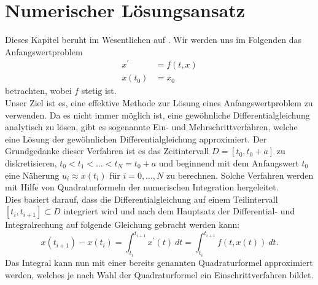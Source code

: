 \section{Numerischer Lösungsansatz}
\label{sec:numeric}
Dieses Kapitel beruht im Wesentlichen auf \cite{p.deuflhardf.bornemannNumerischeMathematikGewohnliche,
ernsthairergerhardwannerSolvingOrdinaryDifferential, prof.dr.josefstoerNumerischeMathematik}. Wir werden uns im
Folgenden das Anfangswertproblem
\begin{align}
    \label{first-order-num}
    x^{\prime} &= f(t,x) \nonumber \\
    x(t_0) &= x_0
\end{align}
betrachten, wobei $f$ stetig ist.\\
Unser Ziel ist es, eine effektive Methode zur Lösung eines Anfangswertproblem zu verwenden.
Da es nicht immer möglich ist, eine gewöhnliche Differentialgleichung analytisch zu lösen, gibt es sogenannte Ein- und
Mehrschrittverfahren, welche  eine Lösung der gewöhnlichen Differentialgleichung approximiert.
Der Grundgedanke dieser Verfahren ist es das Zeitintervall \linebreak $D=[t_0,t_{0}+a]$ zu diskretisieren,
$t_0 < t_1 < \dots < t_N = t_{0}+a$ und beginnend mit dem Anfangswert $t_0$ eine Näherung $u_i \approx x(t_i)$ für
$i=0, \dots, N$ zu berechnen. Solche Verfahren werden mit Hilfe von Quadraturformeln der numerischen Integration
\cite[Numerische Integration]{walzLexikonMathematik} hergeleitet.\\
Dies basiert darauf, dass die Differentialgleichung auf einem Teilintervall $[t_i, t_{i+1}] \subset D$
integriert wird und nach dem Hauptsatz der Differential- und Integralrechung auf folgende Gleichung gebracht werden kann:
\[
    x(t_{i+1}) - x(t_i) = \int_{t_i}^{t_{i+1}} x^{\prime}(t)\ dt = \int_{t_i}^{t_{i+1}}f(t, x(t))\ dt.
\]
Das Integral kann nun mit einer bereits genannten Quadraturformel approximiert werden, welches je nach Wahl der
Quadraturformel ein Einschrittverfahren bildet.
